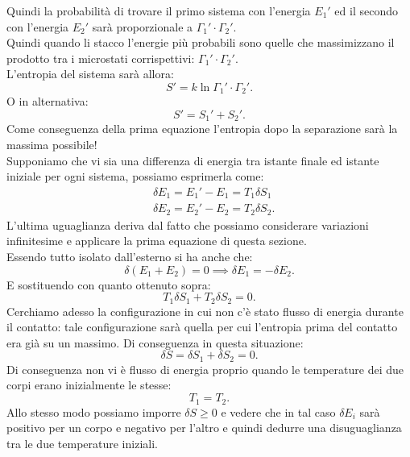 Quindi la probabilità di trovare il primo sistema con l'energia $E_1'$ ed il secondo con l'energia $E_2'$ sarà proporzionale a $\Gamma_1'\cdot \Gamma_2'$.\\
Quindi quando li stacco l'energie più probabili sono quelle che massimizzano il prodotto tra i microstati corrispettivi: $\Gamma_1'\cdot \Gamma_2'$.\\
L'entropia del sistema sarà allora:
\[
	S' = k \ln \Gamma_1'\cdot \Gamma_2'
.\] 
O in alternativa:
\[
	S' = S_1' + S_2'
.\] 
Come conseguenza della prima equazione l'entropia dopo la separazione sarà la massima possibile!\\
Supponiamo che vi sia una differenza di energia tra istante finale ed istante iniziale per ogni sistema, possiamo esprimerla come:
\begin{align}
	&\delta E_1= E_1'-E_1 = T_1 \delta S_1\\
	&\delta E_2 = E_2' - E_2 = T_2 \delta S_2
.\end{align}
L'ultima uguaglianza deriva dal fatto che possiamo considerare variazioni infinitesime e applicare la prima equazione di questa sezione.\\
Essendo tutto isolato dall'esterno si ha anche che:
\[
	\delta \left( E_1 + E_2 \right) = 0 \implies \delta E_1 = - \delta E_2
.\] 
E sostituendo con quanto ottenuto sopra:
\[
	T_1 \delta S_1 + T_2 \delta S_2 = 0
.\] 
Cerchiamo adesso la configurazione in cui non c'è stato flusso di energia durante il contatto: tale configurazione sarà quella per cui l'entropia prima del contatto era già su un massimo. Di conseguenza in questa situazione:
\[
	\delta S = \delta S_1 + \delta S_2 = 0
.\] 
Di conseguenza non vi è flusso di energia proprio quando le temperature dei due corpi erano inizialmente le stesse:
\[
	T_1 = T_2
.\] 
Allo stesso modo possiamo imporre $\delta S\ge 0$ e vedere che in tal caso $\delta E_{i}$ sarà positivo per un corpo e negativo per l'altro e quindi dedurre una disuguaglianza tra le due temperature iniziali.

